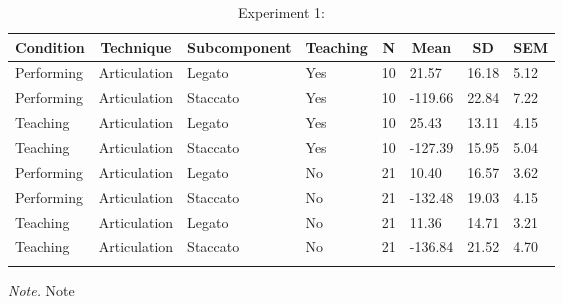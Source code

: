 \documentclass[
  man,floatsintext]{apa6}
\begin{document}
\begin{table}[tbp]

\begin{center}
\begin{threeparttable}

\caption{\label{tab:art-teaching-desc-1}Experiment 1:}

\begin{tabular}{llllllll}
\toprule
Condition & \multicolumn{1}{c}{Technique} & \multicolumn{1}{c}{Subcomponent} & \multicolumn{1}{c}{Teaching} & \multicolumn{1}{c}{N} & \multicolumn{1}{c}{Mean} & \multicolumn{1}{c}{SD} & \multicolumn{1}{c}{SEM}\\
\midrule
Performing & Articulation & Legato & Yes & 10 & 21.57 & 16.18 & 5.12\\
Performing & Articulation & Staccato & Yes & 10 & -119.66 & 22.84 & 7.22\\
Teaching & Articulation & Legato & Yes & 10 & 25.43 & 13.11 & 4.15\\
Teaching & Articulation & Staccato & Yes & 10 & -127.39 & 15.95 & 5.04\\
Performing & Articulation & Legato & No & 21 & 10.40 & 16.57 & 3.62\\
Performing & Articulation & Staccato & No & 21 & -132.48 & 19.03 & 4.15\\
Teaching & Articulation & Legato & No & 21 & 11.36 & 14.71 & 3.21\\
Teaching & Articulation & Staccato & No & 21 & -136.84 & 21.52 & 4.70\\
\bottomrule
\addlinespace
\end{tabular}

\begin{tablenotes}[para]
\normalsize{\textit{Note.} Note}
\end{tablenotes}

\end{threeparttable}
\end{center}

\end{table}
\end{document}

